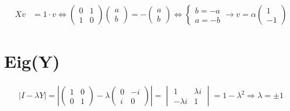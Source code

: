 \documentclass[12pt]{article}
\begin{document}
\begin{equation*}
\begin{aligned}
Xv & = 1 \cdot v \Leftrightarrow 
\begin{pmatrix}
0 & 1 \\ 
1 & 0 
\end{pmatrix}
\begin{pmatrix}
a \\ 
b 
\end{pmatrix}
=
- \begin{pmatrix}
a \\ 
b 
\end{pmatrix}
\Leftrightarrow 
\begin{cases}
b = -a \\
a = -b
\end{cases}
\rightarrow
v = 
\alpha
\begin{pmatrix}
1 \\ 
-1 
\end{pmatrix}
\end{aligned}
\end{equation*}


\section{Eig(Y)}

\begin{equation*}
\begin{aligned}
| I - \lambda Y |
=
\left|
\begin{pmatrix}
1 & 0 \\ 
0 & 1 
\end{pmatrix}
- \lambda
\begin{pmatrix}
0 & -i \\ 
i & 0 
\end{pmatrix}
\right|
=
\begin{vmatrix}
1 & \lambda i \\ 
-\lambda i & 1 
\end{vmatrix}
= 1 - \lambda^2
\Rightarrow
\lambda = \pm 1
\end{aligned}
\end{equation*}

\end{document}
